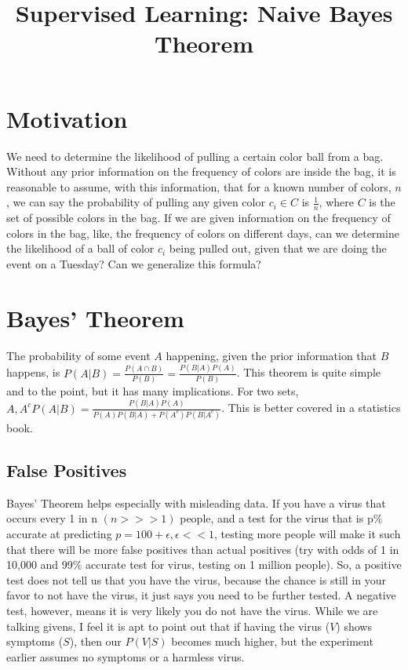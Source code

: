 \documentclass{article}
\title{Supervised Learning: Naive Bayes Theorem}
\begin{document}
\maketitle
\section{Motivation}
We need to determine the likelihood of pulling a certain color ball from a bag. Without any prior information on the frequency of colors are inside the bag, it is reasonable to assume, with this information, that for a known number of colors, $n$, we can say the probability of pulling any given color $c_i\in C$ is $\frac{1}{n}$, where $C$ is the set of possible colors in the bag. If we are given information on the frequency of colors in the bag, like, the frequency of colors on different days, can we determine the likelihood of a ball of color $c_i$ being pulled out, given that we are doing the event on a Tuesday? Can we generalize this formula?

\section{Bayes' Theorem}
The probability of some event $A$ happening, given the prior information that $B$ happens, is $P(A|B) = \frac{P(A\cap B)}{P(B)} = \frac{P(B|A)P(A)}{P(B)}$. This theorem is quite simple and to the point, but it has many implications. For two sets, $A, A^c P(A|B) =  \frac{P(B|A)P(A)}{P(A)P(B|A) + P(A^c)P(B|A^c)}$. This is better covered in a statistics book. %

\subsection{False Positives}
Bayes' Theorem helps especially with misleading data. If you have a virus that occurs every 1 in n $(n >>> 1)$ people, and a test for the virus that is p\% accurate at predicting $p = 100 + \epsilon, \epsilon << 1$, testing more people will make it such that there will be more false positives than actual positives (try with odds of 1 in 10,000 and 99\% accurate test for virus, testing on 1 million people). So, a positive test does not tell us that you have the virus, because the chance is still in your favor to not have the virus, it just says you need to be further tested. A negative test, however, means it is very likely you do not have the virus. While we are talking givens, I feel it is apt to point out that if having the virus ($V$) shows symptoms ($S$), then our $P(V|S)$ becomes much higher, but the experiment earlier assumes no symptoms or a harmless virus. 
\end{document}

